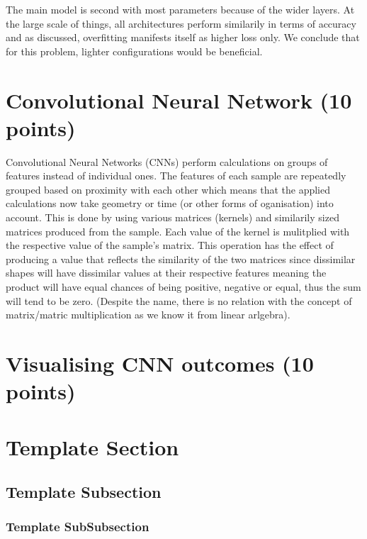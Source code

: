 \documentclass{article}
\begin{document}
The main model is second with most parameters because of the wider layers.
At the large scale of things, all architectures perform similarily in terms of accuracy and as discussed, overfitting manifests itself as higher loss only.
We conclude that for this problem, lighter configurations would be beneficial.

\section{Convolutional Neural Network (10 points)}

Convolutional Neural Networks (CNNs) perform calculations on groups of features instead of individual ones.
The features of each sample are repeatedly grouped based on proximity with each other which means that the applied calculations now take geometry or time (or other forms of oganisation) into account.
This is done by using various matrices (kernels) and similarily sized matrices produced from the sample.
Each value of the kernel is mulitplied with the respective value of the sample's matrix.
This operation has the effect of producing a value that reflects the similarity of the two matrices since dissimilar shapes will have dissimilar values at their respective features meaning the product will have equal chances of being positive, negative or equal, thus the sum will tend to be zero.
(Despite the name, there is no relation with the concept of matrix/matric multiplication as we know it from linear arlgebra).


\section{Visualising CNN outcomes (10 points)}


\section{Template Section}
\subsection{Template Subsection}
\subsubsection{Template SubSubsection}
\end{document}
